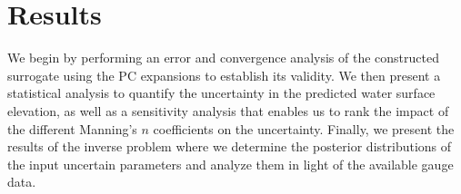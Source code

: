 \section{Results}
\label{sec:results}
We begin by performing an error and convergence 
analysis of the constructed surrogate using the PC expansions to 
establish its validity. We then present a statistical analysis to quantify the 
uncertainty in the predicted water surface elevation, as well as a 
sensitivity analysis that enables us to rank the impact of the 
different Manning's $n$ coefficients on the uncertainty. Finally, 
we present the results of the inverse problem 
where we determine the posterior distributions of the input uncertain
parameters and analyze them in light of the available gauge data.



